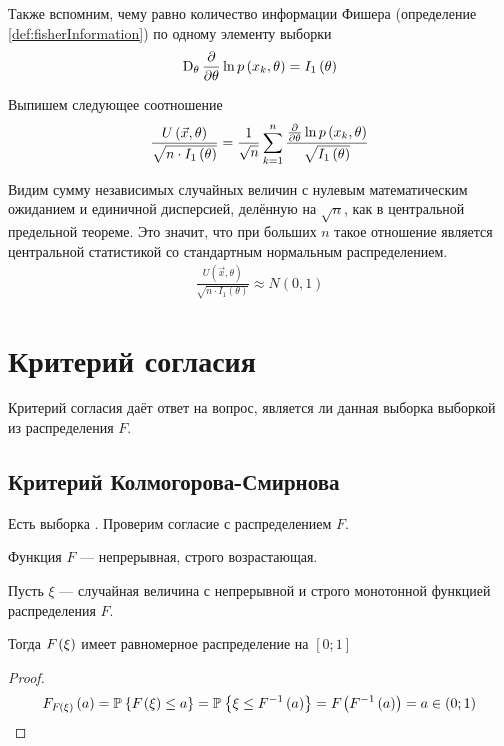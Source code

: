 Также вспомним, чему равно количество информации Фишера (определение
\ref{def:fisherInformation}) по одному элементу выборки
\begin{align*}
  \operatorname{D}_{\theta} \frac{\partial}{\partial\theta}
      \ln{p\left(x_k, \theta\right)}
  = I_1\left( \theta \right)
\end{align*}

Выпишем следующее соотношение
\begin{align*}
  \frac{U\left( \vec{x}, \theta \right)}{
      \sqrt{n \cdot I_1\left( \theta \right)}}
  = \frac{1}{\sqrt{n}} \sum_{k=1}^{n}\frac{
      \frac{\partial}{\partial\theta}\ln{p\left(x_k, \theta\right)}}{
      \sqrt{I_1\left( \theta \right)}}
\end{align*}

Видим сумму независимых случайных величин с нулевым математическим ожиданием и
единичной дисперсией, делённую на $\sqrt{n}$, как в центральной предельной
теореме. Это значит, что при больших $n$ такое отношение является центральной
статистикой со стандартным нормальным распределением.
\begin{align*}
  \frac{U\left( \vec{x}, \theta \right)}{
      \sqrt{n \cdot I_1\left( \theta \right)}} \approx N\left( 0, 1 \right)
\end{align*}

\section{Критерий согласия}

Критерий согласия даёт ответ на вопрос, является ли данная выборка
\xsample выборкой из распределения $F$.

\subsection{Критерий Колмогорова-Смирнова}

Есть выборка \xsample. Проверим согласие с распределением $F$.

Функция $F$ --- непрерывная, строго возрастающая.

\begin{lemma}
  Пусть $\xi$ --- случайная величина с непрерывной и строго монотонной
  функцией распределения $F$.

  Тогда $F_{}\left(\xi\right)$ имеет равномерное распределение на $\left[ 0; 1 \right]$
\end{lemma}
\begin{proof}
  \begin{align*}
      F_{F_{}\left(\xi\right)}\left(a\right)
      = \mathbb{P}_{{}}\left\{ F_{}\left(\xi\right) \le a \right\}
      = \mathbb{P}_{{}}\left\{ \xi \le F^{-1}\left( a \right) \right\}
      = F_{}\left(F^{-1}\left( a \right)\right)
      = a \in \left( 0; 1 \right)
  \end{align*}
\end{proof}

